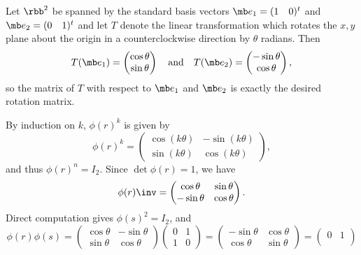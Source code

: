 \begin{solenum}
    \item Let $\rbb^2$ be spanned by the standard basis vectors $\mb e_1 = (1 \quad 0)^t$ and $\mb e_2 = (0 \quad 1)^t$ and let $T$ denote the linear transformation which rotates the $x,y$ plane about the origin in a counterclockwise direction by $\theta$ radians.
	Then
    \[
        T(\mb e_1) = 
        \begin{pmatrix}
            \cos \theta \\
            \sin \theta
        \end{pmatrix} \quad \text{and} \quad
        T(\mb e_2) = 
        \begin{pmatrix}
            -\sin \theta \\
            \cos \theta
        \end{pmatrix},
    \]
    so the matrix of $T$ with respect to $\mb e_1$ and $\mb e_2$ is exactly the desired rotation matrix.
    \item By induction on $k$, $\phi(r)^k$ is given by
    \[
        \phi(r)^k = 
        \begin{pmatrix}
            \cos (k\theta) & -\sin (k\theta) \\
            \sin (k\theta) & \cos (k\theta)
        \end{pmatrix},
    \]
    and thus $\phi(r)^n = I_2$.
    Since $\det\phi(r) = 1$, we have
    \[
        \phi(r)\inv = 
        \begin{pmatrix}
            \cos \theta & \sin \theta \\
            -\sin \theta & \cos \theta
        \end{pmatrix}.
    \]
	Direct computation gives $\phi(s)^2 = I_2$, and
    \[
        \phi(r)\phi(s) = 
        \begin{pmatrix}
            \cos \theta & -\sin \theta \\
            \sin \theta & \cos \theta
        \end{pmatrix}
        \begin{pmatrix}
            0 & 1 \\
            1 & 0
        \end{pmatrix} =
        \begin{pmatrix}
            -\sin\theta & \cos\theta \\
            \cos\theta & \sin\theta
        \end{pmatrix} = 
        \begin{pmatrix}
            0 & 1 \\

\end{pmatrix}\]
\end{solenum}
